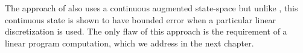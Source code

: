 The approach of \citet{chow2015risk} also uses a continuous augmented state-space but unlike \citet{bauerle2011markov}, this continuous state is shown to have bounded error when a particular linear discretization is used. The only flaw of this approach is the requirement of a linear program computation, which we address in the next chapter.



%
%
%
%
%
%

